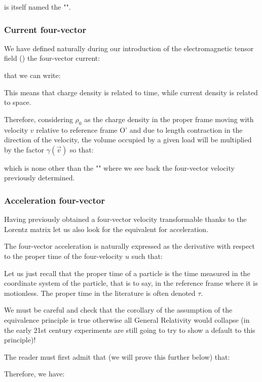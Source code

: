 	is itself named the "".
	
	\subsubsection{Current four-vector}\label{four-vector current}
	We have defined naturally during our introduction of the electromagnetic tensor field () the four-vector current:
	
	that we can write:
	
	This means that charge density is related to time, while current density is related to space.
	
	Therefore, considering $\rho_0$ as the charge density in the proper frame moving with velocity $v$ relative to reference frame O' and due to length contraction in the direction of the velocity, the volume occupied by a given load will be multiplied by the factor $\gamma(\vec{v})$ so that:
	
	which is none other than the "" where we see back the four-vector velocity previously determined.
	
	\subsubsection{Acceleration four-vector}
	Having previously obtained a four-vector velocity transformable thanks to the Lorentz matrix let us also look for the equivalent for acceleration.

	The four-vector acceleration is naturally expressed as the derivative with respect to the proper time of the four-velocity $u$ such that:
	
	Let us just recall that the proper time of a particle is the time measured in the coordinate system of the particle, that is to say, in the reference frame where it is motionless. The proper time in the literature is often denoted $\tau$.
	\begin{tcolorbox}[title=Remark,colframe=black,arc=10pt]
	We must be careful and check that the corollary of the assumption of the equivalence principle is true otherwise all General Relativity would collapse (in the early 21st century experiments are still going to try to show a default to this principle)!
	\end{tcolorbox}	
	The reader must first admit that (we will prove this further below) that:
	
	Therefore, we have:
	
